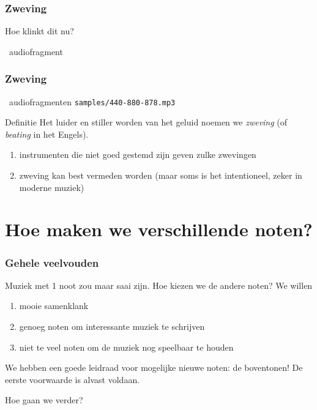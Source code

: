 \documentclass[compress, darktitle, framenumber, totalframenumber]{beamer}
\begin{document}
\begin{frame}
  \frametitle{Zweving}

  Hoe klinkt dit nu?

  \begin{block}{\twonotes\ audiofragment}
  \end{block}
\end{frame}

\begin{frame}
  \frametitle{Zweving}

  \begin{block}{\twonotes\ audiofragmenten}
    \texttt{samples/440-880-878.mp3} \\
  \end{block}

  \pause

  \begin{alertblock}{Definitie}
    Het luider en stiller worden van het geluid noemen we \emph{zweving} (of \emph{beating} in het Engels).
  \end{alertblock}

  \begin{enumerate}
    \item instrumenten die niet goed gestemd zijn geven zulke zwevingen
    \item zweving kan best vermeden worden (maar soms is het intentioneel, zeker in moderne muziek)
  \end{enumerate}
\end{frame}


\section{Hoe maken we verschillende noten?}

\begin{frame}
  \frametitle{Gehele veelvouden}

  Muziek met 1 noot zou maar saai zijn. Hoe kiezen we de andere noten? \pause We willen
  \begin{enumerate}
    \item mooie samenklank
    \item \pause genoeg noten om interessante muziek te schrijven
    \item \pause niet te veel noten om de muziek nog speelbaar te houden
  \end{enumerate}

  We hebben een goede leidraad voor mogelijke nieuwe noten: de \alert{boventonen}! De eerste voorwaarde is alvast voldaan.

  Hoe gaan we verder?
\end{frame}
\end{document}

